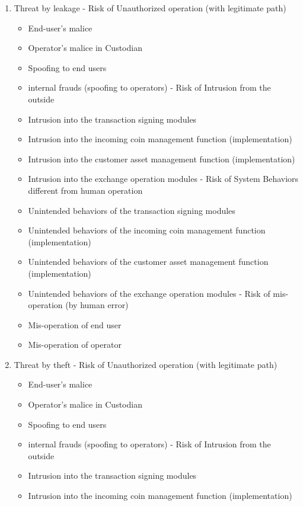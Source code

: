 \begin{enumerate}
  \item Threat by leakage - Risk of Unauthorized operation (with legitimate path)
  \begin{itemize}
    \item End-user's malice
    \item Operator's malice in Custodian
    \item Spoofing to end users
    \item internal frauds (spoofing to operators) - Risk of Intrusion from the outside
    \item Intrusion into the transaction signing modules
    \item Intrusion into the incoming coin management function (implementation)
    \item Intrusion into the customer asset management function (implementation)
    \item Intrusion into the exchange operation modules - Risk of System Behaviors different from human operation
    \item Unintended behaviors of the transaction signing modules
    \item Unintended behaviors of the incoming coin management function (implementation)
    \item Unintended behaviors of the customer asset management function (implementation)
    \item Unintended behaviors of the exchange operation modules - Risk of mis-operation (by human error)
    \item Mis-operation of end user
    \item Mis-operation of operator
  \end{itemize}
  \item Threat by theft - Risk of Unauthorized operation (with legitimate path)
  \begin{itemize}
    \item End-user's malice

    \item Operator's malice in Custodian

    \item Spoofing to end users

    \item internal frauds (spoofing to operators) - Risk of Intrusion from the outside

    \item Intrusion into the transaction signing modules

    \item Intrusion into the incoming coin management function (implementation)


\end{itemize}
\end{enumerate}
